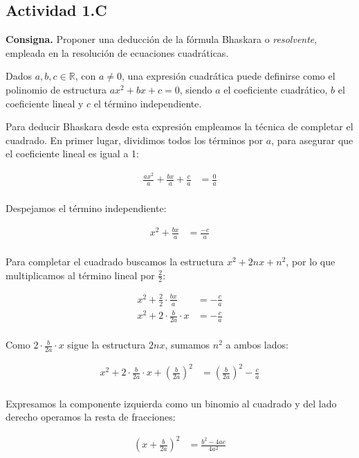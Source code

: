 \subsection*{Actividad 1.C}
\textbf{Consigna. }
Proponer una deducción de la fórmula Bhaskara o \textit{resolvente},
empleada en la resolución de ecuaciones cuadráticas.

Dados $a, b, c \in \mathbb{R}$, con $a \neq 0$,
una expresión cuadrática puede definirse como el polinomio de estructura $ax^2 + bx + c = 0$,
siendo $a$ el coeficiente cuadrático,
$b$ el coeficiente lineal
y $c$ el término independiente.

Para deducir Bhaskara desde esta expresión empleamos la técnica de completar el cuadrado.
En primer lugar,
dividimos todos los términos por $a$,
para asegurar que el coeficiente lineal es igual a 1:

\begin{align*}
	\frac{ax^2}{a} + \frac{bx}{a} + \frac{c}{a} & = \frac{0}{a} \\
\end{align*}

Despejamos el término independiente:

\begin{align*}
	x^2 + \frac{bx}{a} & = \frac{-c}{a} \\
\end{align*}

Para completar el cuadrado buscamos la estructura $x^2 + 2nx + n^2$,
por lo que multiplicamos al término lineal por $\frac{2}{2}$:

\begin{align*}
	x^2 + \frac{2}{2} \cdot \frac{bx}{a} & = - \frac{c}{a} \\
	x^2 + 2 \cdot \frac{b}{2a} \cdot x   & = - \frac{c}{a} \\
\end{align*}

Como $2 \cdot \frac{b}{2a} \cdot x$ sigue la estructura $2nx$, sumamos $n^2$ a ambos lados:

\begin{align*}
	x^2 + 2 \cdot \frac{b}{2a} \cdot x + \left(\frac{b}{2a}\right)^2 & = \left(\frac{b}{2a}\right)^2 - \frac{c}{a} \\
\end{align*}

Expresamos la componente izquierda como un binomio al cuadrado y del lado derecho operamos la resta de fracciones:

\begin{align*}
	\left(x + \frac{b}{2a}\right)^2 & = \frac{b^2 - 4ac}{4a^2} \\
\end{align*}

